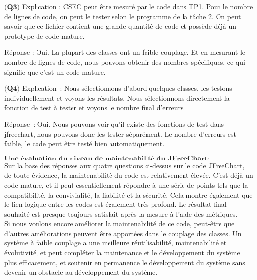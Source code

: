 \documentclass{article}
\begin{document}
\item$\textbf{(Q3)}$
Explication : CSEC peut être mesuré par le code dans TP1. Pour le nombre de lignes de code, on peut le tester selon le programme de la tâche 2. On peut savoir que ce fichier contient une grande quantité de code et possède déjà un prototype de code mature.

Réponse : Oui. La plupart des classes ont un faible couplage. Et en mesurant le nombre de lignes de code, nous pouvons obtenir des nombres spécifiques, ce qui signifie que c'est un code mature.

\item$\textbf{(Q4)}$
Explication : Nous sélectionnons d'abord quelques classes, les testons individuellement et voyons les résultats. Nous sélectionnons directement la fonction de test à tester et voyons le nombre final d'erreurs.

Réponse : Oui. Nous pouvons voir qu'il existe des fonctions de test dans jfreechart, nous pouvons donc les tester séparément. Le nombre d'erreurs est faible, le code peut être testé bien automatiquement.\\

\item$\textbf{Une évaluation du niveau de maintenabilité du JFreeChart:}$\\

Sur la base des réponses aux quatre questions ci-dessus sur le code JFreeChart, de toute évidence, la maintenabilité du code est relativement élevée. C'est déjà un code mature, et il peut essentiellement répondre à une série de points tels que la compatibilité, la convivialité, la fiabilité et la sécurité. Cela montre également que le lien logique entre les codes est également très profond. Le résultat final souhaité est presque toujours satisfait après la mesure à l'aide des métriques.\\

Si nous voulons encore améliorer la maintenabilité de ce code, peut-être que d'autres améliorations peuvent être apportées dans le couplage des classes. Un système à faible couplage a une meilleure réutilisabilité, maintenabilité et évolutivité, et peut compléter la maintenance et le développement du système plus efficacement, et soutenir en permanence le développement du système sans devenir un obstacle au développement du système.
\end{document}
